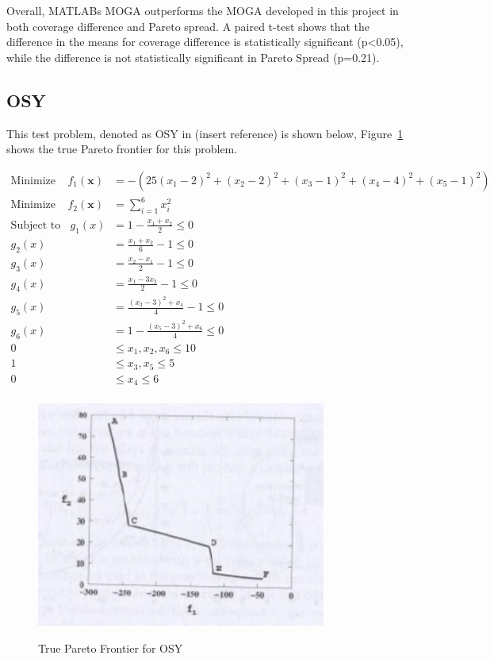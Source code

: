 \documentclass{article}
\begin{document}
Overall, MATLABs MOGA outperforms the MOGA developed in this project in both coverage difference and Pareto spread. A paired t-test shows that the difference in the means for coverage difference is statistically significant (p<0.05), while the difference is not statistically significant in Pareto Spread (p=0.21). 

\subsection{OSY} 
This test problem, denoted as OSY in (insert reference) is shown below, Figure~\ref{fig:OSY_true} shows the true Pareto frontier for this problem.


\begin{align*}
\textrm{Minimize} ~~~~~ f_1(\textbf{x}) &= -(25(x_1-2)^2+(x_2-2)^2+(x_3-1)^2+(x_4-4)^2+(x_5-1)^2) \\
\textrm{Minimize} ~~~~~ f_2(\textbf{x}) &= \sum_{i=1}^{6}x_i^2 \\
\textrm{Subject to} ~~~~ g_1(x) &= 1-\frac{x_1+x_2}{2} \leq 0 \\
g_2(x) &= \frac{x_1+x_2}{6}-1 \leq 0 \\
g_3(x) &= \frac{x_2-x_1}{2}-1 \leq 0 \\
g_4(x) &= \frac{x_1-3x_2}{2}-1 \leq 0 \\
g_5(x) &= \frac{(x_3-3)^2+x_4}{4}-1 \leq 0 \\
g_6(x) &= 1-\frac{(x_5-3)^2+x_6}{4} \leq 0 \\
0 &\leq  x_1,x_2,x_6  \leq 10 \\
1 &\leq  x_3,x_5  \leq 5 \\
0 &\leq  x_4  \leq 6 \\
\end{align*}
\begin{figure}[h]
  \caption{True Pareto Frontier for OSY}
  \centering
  \includegraphics[width=0.85\textwidth]{OSY_pareto_true.png}  
  \label{fig:OSY_true}
\end{figure}
\end{document}
